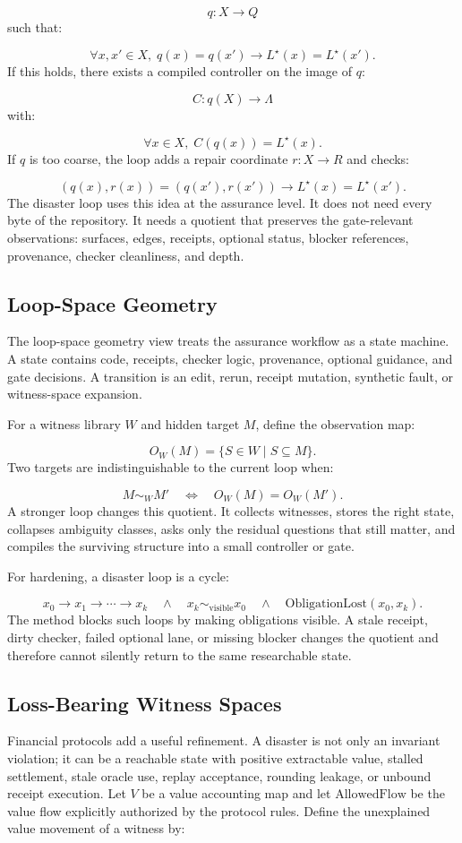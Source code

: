 \documentclass[11pt]{article}
\begin{document}
\[
q:X\to Q
\]
such that:

\[
\forall x,x'\in X,\;q(x)=q(x')\rightarrow L^\star(x)=L^\star(x').
\]
If this holds, there exists a compiled controller on the image of $q$:

\[
C:q(X)\to\Lambda
\]
with:

\[
\forall x\in X,\;C(q(x))=L^\star(x).
\]
If $q$ is too coarse, the loop adds a repair coordinate $r:X\to R$ and checks:

\[
(q(x),r(x))=(q(x'),r(x'))\rightarrow L^\star(x)=L^\star(x').
\]
The disaster loop uses this idea at the assurance level. It does not need every byte of the repository. It needs a quotient that preserves the gate-relevant observations: surfaces, edges, receipts, optional status, blocker references, provenance, checker cleanliness, and depth.

\subsection{Loop-Space Geometry}
The loop-space geometry view treats the assurance workflow as a state machine. A state contains code, receipts, checker logic, provenance, optional guidance, and gate decisions. A transition is an edit, rerun, receipt mutation, synthetic fault, or witness-space expansion.

For a witness library $W$ and hidden target $M$, define the observation map:

\[
O_W(M)=\{S\in W\mid S\subseteq M\}.
\]
Two targets are indistinguishable to the current loop when:

\[
M\sim_W M'\quad\Longleftrightarrow\quad O_W(M)=O_W(M').
\]
A stronger loop changes this quotient. It collects witnesses, stores the right state, collapses ambiguity classes, asks only the residual questions that still matter, and compiles the surviving structure into a small controller or gate.

For hardening, a disaster loop is a cycle:

\[
x_0\to x_1\to\cdots\to x_k
\quad\wedge\quad
x_k\sim_{\mathrm{visible}}x_0
\quad\wedge\quad
\mathrm{ObligationLost}(x_0,x_k).
\]
The method blocks such loops by making obligations visible. A stale receipt, dirty checker, failed optional lane, or missing blocker changes the quotient and therefore cannot silently return to the same researchable state.

\subsection{Loss-Bearing Witness Spaces}
Financial protocols add a useful refinement. A disaster is not only an invariant violation; it can be a reachable state with positive extractable value, stalled settlement, stale oracle use, replay acceptance, rounding leakage, or unbound receipt execution. Let $V$ be a value accounting map and let $\mathrm{AllowedFlow}$ be the value flow explicitly authorized by the protocol rules. Define the unexplained value movement of a witness by:
\end{document}
